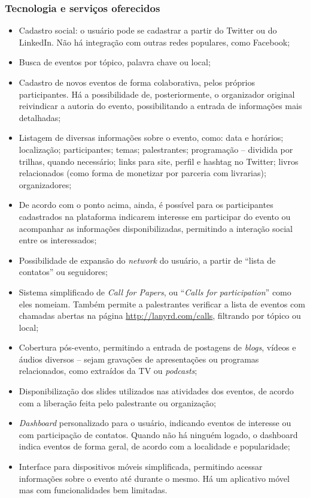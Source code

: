 \documentclass[12pt,a4paper,twoside,hyphens,english,brazil]{abntex2}
\begin{document}
\subsubsection*{Tecnologia e serviços oferecidos}
\begin{itemize}[itemsep=-1ex]
	\item Cadastro social: o usuário pode se cadastrar a partir do Twitter ou do LinkedIn. Não há integração com outras redes populares, como Facebook;
	\item Busca de eventos por tópico, palavra chave ou local;
	\item Cadastro de novos eventos de forma colaborativa, pelos próprios participantes. Há a possibilidade de, posteriormente, o organizador original reivindicar a autoria do evento, possibilitando a entrada de informações mais detalhadas;
	\item Listagem de diversas informações sobre o evento, como: data e horários; localização; participantes; temas; palestrantes; programação -- dividida por trilhas, quando necessário; links para site, perfil e hashtag no Twitter; livros relacionados (como forma de monetizar por parceria com livrarias); organizadores;
	\item De acordo com o ponto acima, ainda, é possível para os participantes cadastrados na plataforma indicarem interesse em participar do evento ou acompanhar as informações disponibilizadas, permitindo a interação social entre os interessados;
	\item Possibilidade de expansão do \emph{network} do usuário, a partir de ``lista de contatos'' ou seguidores;
	\item Sistema simplificado de \emph{Call for Papers}, ou ``\emph{Calls for participation}'' como eles nomeiam. Também permite a palestrantes verificar a lista de eventos com chamadas abertas na página \url{http://lanyrd.com/calls}, filtrando por tópico ou local;
	\item Cobertura pós-evento, permitindo a entrada de postagens de \emph{blogs}, vídeos e áudios diversos -- sejam gravações de apresentações ou programas relacionados, como extraídos da TV ou \emph{podcasts};
	\item Disponibilização dos slides utilizados nas atividades dos eventos, de acordo com a liberação feita pelo palestrante ou organização;
	\item \emph{Dashboard} personalizado para o usuário, indicando eventos de interesse ou com participação de contatos. Quando não há ninguém logado, o dashboard indica eventos de forma geral, de acordo com a localidade e popularidade;
	\item Interface para dispositivos móveis simplificada, permitindo acessar informações sobre o evento até durante o mesmo. Há um aplicativo móvel mas com funcionalidades bem limitadas.
\end{itemize}
\end{document}
